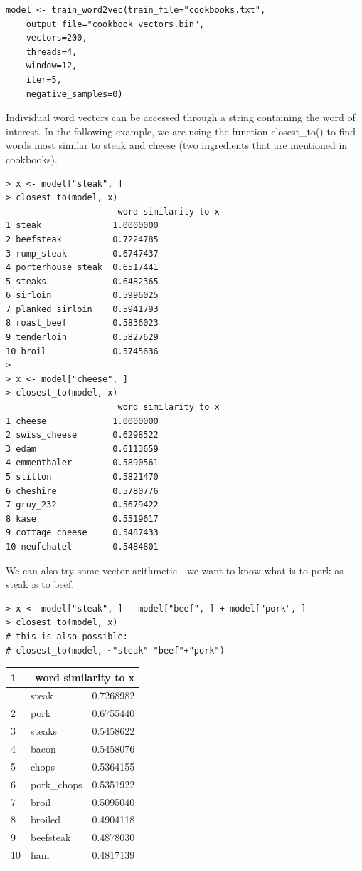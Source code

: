 \begin{verbatim}
model <- train_word2vec(train_file="cookbooks.txt",
    output_file="cookbook_vectors.bin",
    vectors=200,
    threads=4,
    window=12,
    iter=5,
    negative_samples=0)
\end{verbatim}

Individual word vectors can be accessed through a string containing the word of interest. In the following example, we are using the function closest\_to() to find words most similar to steak and cheese (two ingredients that are mentioned in cookbooks).
\begin{verbatim}
> x <- model["steak", ]
> closest_to(model, x)
                      word similarity to x
1 steak              1.0000000
2 beefsteak          0.7224785
3 rump_steak         0.6747437
4 porterhouse_steak  0.6517441
5 steaks             0.6482365
6 sirloin            0.5996025
7 planked_sirloin    0.5941793
8 roast_beef         0.5836023
9 tenderloin         0.5827629
10 broil             0.5745636
>
> x <- model["cheese", ]
> closest_to(model, x)
                      word similarity to x
1 cheese             1.0000000
2 swiss_cheese       0.6298522
3 edam               0.6113659
4 emmenthaler        0.5890561
5 stilton            0.5821470
6 cheshire           0.5780776
7 gruy_232           0.5679422
8 kase               0.5519617
9 cottage_cheese     0.5487433
10 neufchatel        0.5484801
\end{verbatim}

We can also try some vector arithmetic - we want to know what is to pork as steak is to beef.

\begin{verbatim}
> x <- model["steak", ] - model["beef", ] + model["pork", ]
> closest_to(model, x)
# this is also possible:
# closest_to(model, ~"steak"-"beef"+"pork")
\end{verbatim}

\begin{center}
\begin{tabular}{|l|l|l|}
\hline
\multirow[b]{2}{*}{1} & \multicolumn{2}{|r|}{word similarity to x} \\
\hline
 & steak & 0.7268982 \\
\hline
2 & pork & 0.6755440 \\
\hline
3 & steaks & 0.5458622 \\
\hline
4 & bacon & 0.5458076 \\
\hline
5 & chops & 0.5364155 \\
\hline
6 & pork\_chops & 0.5351922 \\
\hline
7 & broil & 0.5095040 \\
\hline
8 & broiled & 0.4904118 \\
\hline
9 & beefsteak & 0.4878030 \\
\hline
10 & ham & 0.4817139 \\
\hline
\end{tabular}
\end{center}

